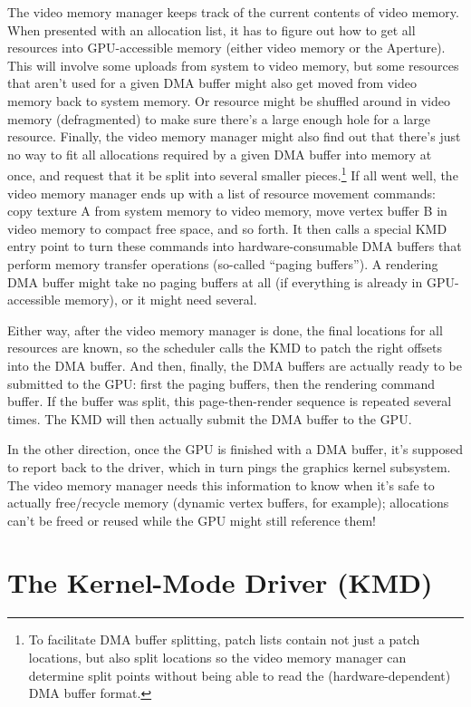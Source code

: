 The video memory manager keeps track of the current contents of video memory.  
When presented with an allocation list, it has to figure out how to get all 
resources into GPU-accessible memory (either video memory or the Aperture).  
This will involve some uploads from system to video memory, but some resources 
that aren't used for a given DMA buffer might also get moved from video memory 
back to system memory. Or resource might be shuffled around in video memory 
(defragmented) to make sure there's a large enough hole for a large resource.  
Finally, the video memory manager might also find out that there's just no way 
to fit all allocations required by a given DMA buffer into memory at once, and 
request that it be split into several smaller pieces.\footnote{To facilitate 
DMA buffer splitting, patch lists contain not just a patch locations, but also 
split locations so the video memory manager can determine split points without 
being able to read the (hardware-dependent) DMA buffer format.} If all went 
well, the video memory manager ends up with a list of resource movement 
commands: copy texture A from system memory to video memory, move vertex buffer 
B in video memory to compact free space, and so forth. It then calls a special 
KMD entry point to turn these commands into hardware-consumable DMA buffers 
that perform memory transfer operations (so-called ``paging buffers'').  
A rendering DMA buffer might take no paging buffers at all (if everything is 
already in GPU-accessible memory), or it might need several.

Either way, after the video memory manager is done, the final locations for all 
resources are known, so the scheduler calls the KMD to patch the right offsets 
into the DMA buffer. And then, finally, the DMA buffers are actually ready to 
be submitted to the GPU: first the paging buffers, then the rendering command 
buffer. If the buffer was split, this page-then-render sequence is repeated 
several times. The KMD will then actually submit the DMA buffer to the GPU.

In the other direction, once the GPU is finished with a DMA buffer, it's 
supposed to report back to the driver, which in turn pings the graphics kernel 
subsystem. The video memory manager needs this information to know when it's 
safe to actually free/recycle memory (dynamic vertex buffers, for example); 
allocations can't be freed or reused while the GPU might still reference them!
 
\section{The Kernel-Mode Driver (KMD)}

